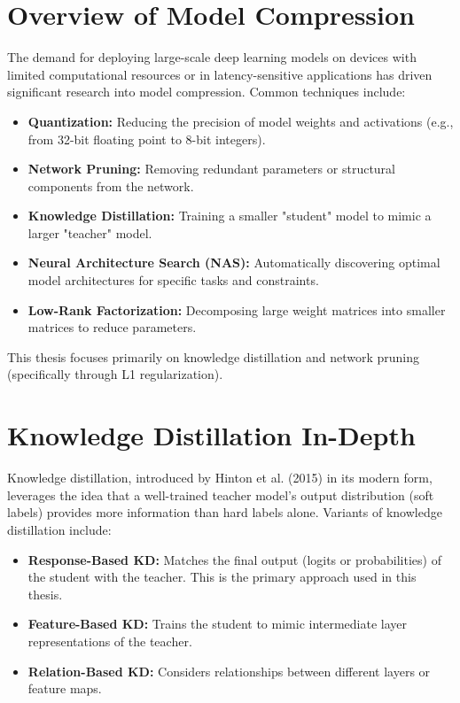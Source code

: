 \documentclass[12pt, a4paper]{report}
\begin{document}
\section{Overview of Model Compression}
\label{sec:overview_model_compression}
The demand for deploying large-scale deep learning models on devices with limited computational resources or in latency-sensitive applications has driven significant research into model compression. Common techniques include:
\begin{itemize}
    \item \textbf{Quantization:} Reducing the precision of model weights and activations (e.g., from 32-bit floating point to 8-bit integers).
    \item \textbf{Network Pruning:} Removing redundant parameters or structural components from the network.
    \item \textbf{Knowledge Distillation:} Training a smaller "student" model to mimic a larger "teacher" model.
    \item \textbf{Neural Architecture Search (NAS):} Automatically discovering optimal model architectures for specific tasks and constraints.
    \item \textbf{Low-Rank Factorization:} Decomposing large weight matrices into smaller matrices to reduce parameters.
\end{itemize}
This thesis focuses primarily on knowledge distillation and network pruning (specifically through L1 regularization).

\section{Knowledge Distillation In-Depth}
\label{sec:kd_in_depth}
Knowledge distillation, introduced by Hinton et al. (2015) in its modern form, leverages the idea that a well-trained teacher model's output distribution (soft labels) provides more information than hard labels alone. Variants of knowledge distillation include:
\begin{itemize}
    \item \textbf{Response-Based KD:} Matches the final output (logits or probabilities) of the student with the teacher. This is the primary approach used in this thesis.
    \item \textbf{Feature-Based KD:} Trains the student to mimic intermediate layer representations of the teacher.
    \item \textbf{Relation-Based KD:} Considers relationships between different layers or feature maps.
\end{itemize}
\end{document}
